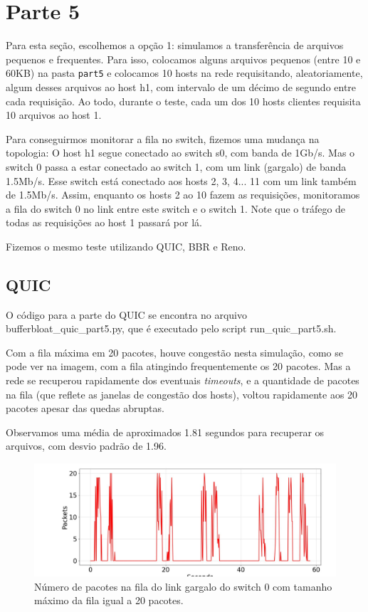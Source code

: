 \documentclass[a4paper,12pt]{article}
\newcommand{\code}[1]{\texttt{#1}}
\begin{document}
\section{Parte 5}

Para esta seção, escolhemos a opção 1: simulamos a transferência de arquivos pequenos e frequentes. Para isso, colocamos alguns arquivos pequenos (entre 10 e 60KB) na pasta \code{part5} e colocamos 10 hosts na rede requisitando, aleatoriamente, algum desses arquivos ao host h1, com intervalo de um décimo de segundo entre cada requisição. Ao todo, durante o teste, cada um dos 10 hosts clientes requisita 10 arquivos ao host 1.

Para conseguirmos monitorar a fila no switch, fizemos uma mudança na topologia: O host h1 segue conectado ao switch s0, com banda de 1Gb/s. Mas o switch 0 passa a estar conectado ao switch 1, com um link (gargalo) de banda 1.5Mb/s. Esse switch está conectado aos hosts 2, 3, 4... 11 com um link também de 1.5Mb/s. Assim, enquanto os hosts 2 ao 10 fazem as requisições, monitoramos a fila do switch 0 no link entre este switch e o switch 1. Note que o tráfego de todas as requisições ao host 1 passará por lá. 

Fizemos o mesmo teste utilizando QUIC, BBR e Reno. 

\subsection{QUIC}

O código para a parte do QUIC se encontra no arquivo bufferbloat_quic_part5.py, que é executado pelo script run_quic_part5.sh.

Com a fila máxima em 20 pacotes, houve congestão nesta simulação, como se pode ver na imagem, com a fila atingindo frequentemente os 20 pacotes. Mas a rede se recuperou rapidamente dos eventuais \textit{timeouts}, e a quantidade de pacotes na fila (que reflete as janelas de congestão dos hosts), voltou rapidamente aos 20 pacotes apesar das quedas abruptas. 

Observamos uma média de aproximados 1.81 segundos para recuperar os arquivos, com desvio padrão de 1.96.

\begin{figure}[ht!]
  \centering
  \includegraphics[width=0.5\columnwidth]{./bufferbloat/bb-q20/quic-part5-buffer-q20.jpg}
  \caption{Número de pacotes na fila do link gargalo do switch 0 com tamanho máximo da fila igual a 20 pacotes.}
\end{figure}
\end{document}
